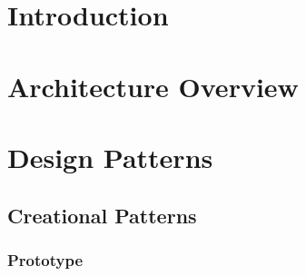\documentclass[a4paper]{article}
\title{\documentTitle}
\author{\documentAuthors}
\begin{document}
\renewcommand{\figurename}{Figure}
\maketitle
\cleardoublepage

\tableofcontents
\cleardoublepage

\setlength{\parindent}{1cm}
\setlength{\parskip}{0.3cm}

\hyphenation{}


\section{Introduction}
\section{Architecture Overview}




\section{Design Patterns}
\subsection{Creational Patterns}
\subsubsection{Prototype}
\end{document}
